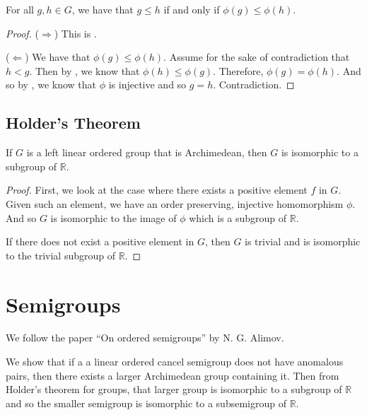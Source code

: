 \begin{theorem}\label{strict_order_preserving_phi}
    \leanok
    For all $g,h \in G$, we have that
    $g \le h$ if and only if $\phi(g) \le \phi(h)$.
\end{theorem}
\begin{proof}\leanok
($\Rightarrow$) This is .

($\Leftarrow$) We have that $\phi(g) \le \phi(h)$.
Assume for the sake of contradiction that $h < g$.
Then by , we know that
$\phi(h) \le \phi(g)$. Therefore, $\phi(g) = \phi(h)$.
And so by , we know that $\phi$ is injective and
so $g = h$. Contradiction.
\end{proof}

\section{Holder's Theorem}
\begin{theorem}\label{holders_theorem}
    \leanok
    If $G$ is a left linear ordered group that is Archimedean,
    then $G$ is isomorphic to a subgroup of $\mathbb{R}$.
\end{theorem}
\begin{proof}\leanok
First, we look at the case where there exists a positive element $f$ in $G$.
Given such an element, we have an order preserving, injective homomorphism
$\phi$. And so $G$ is isomorphic to the image of $\phi$ which is a subgroup of $\mathbb{R}$.

If there does not exist a positive element in $G$,
then $G$ is trivial and is isomorphic to the trivial subgroup of
$\mathbb{R}$.
\end{proof}

\chapter{Semigroups}
We follow the paper ``On ordered semigroups'' by
N. G. Alimov.

We show that if a a linear ordered cancel semigroup
does not have anomalous pairs, then there exists a larger
Archimedean group containing it. Then from Holder's theorem for groups,
that larger group is isomorphic to a subgroup of $\mathbb{R}$
and so the smaller semigroup is isomorphic to a subsemigroup of $\mathbb{R}$.

